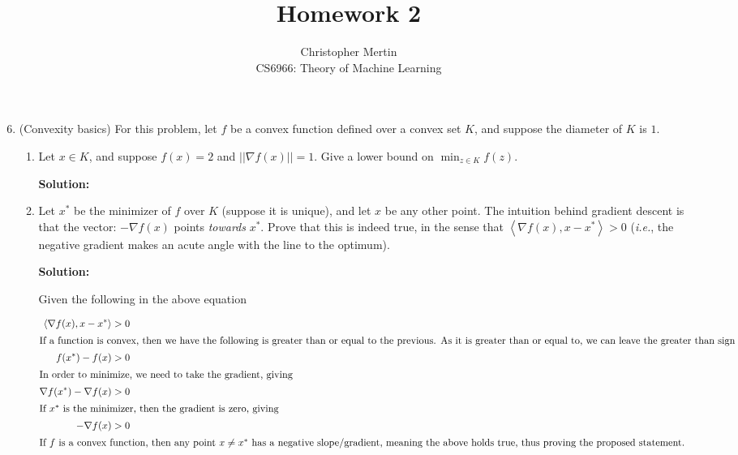 \documentclass[12pt]{article}
\newcommand{\norm}[1]{\left|\left| #1 \right|\right|}
\newcommand{\inner}[2]{\left< #1 , #2\right>}
\newcommand{\grad}{\nabla}
\begin{document}
 
 
\title{Homework 2}%
\author{Christopher Mertin\\ %
CS6966: Theory of Machine Learning} %
 
\maketitle

\begin{enumerate}
  \setcounter{enumi}{5}
\item (Convexity basics) For this problem, let $f$ be a convex function defined over a convex set $K$, and suppose the diameter of $K$ is $1$.
  \begin{enumerate}
    \item Let $x \in K$, and suppose $f(x) = 2$ and $\norm{\nabla f(x)} = 1$. Give a lower bound on $\min_{z\in K}f(z)$.

      {\bf Solution:}


      
    \item Let $x^{*}$ be the minimizer of $f$ over $K$ (suppose it is unique), and let $x$ be any other point. The intuition behind gradient descent is that the vector: $-\nabla f(x)$ points {\em towards} $x^{*}$. Prove that this is indeed true, in the sense that $\inner{\nabla f(x)}{x - x^{*}} > 0$ ({\em i.e.}, the negative gradient makes an acute angle with the line to the optimum).

      {\bf Solution:}

Given the following in the above equation

\begin{align*}
\inner{\nabla f(x)}{x - x^{*}} &> 0\\
\intertext{If a function is convex, then we have the following is greater than or equal to the previous. As it is greater than or equal to, we can leave the greater than sign}
f(x^{*}) - f(x) &> 0\\
\intertext{In order to minimize, we need to take the gradient, giving}
\grad f(x^{*}) - \grad f(x) &> 0\\
\intertext{If $x^{*}$ is the minimizer, then the gradient is zero, giving}
-\grad f(x) &> 0\\
\intertext{If $f$ is a convex function, then any point $x \neq x^{*}$ has a negative slope/gradient, meaning the above holds true, thus proving the proposed statement.}
\end{align*}



\end{enumerate}
\end{enumerate}
\end{document}
